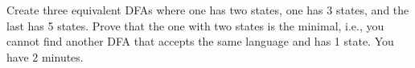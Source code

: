   Create three equivalent DFAs
  where
  one has two states, one has 3 states, and the last has 5 states.
  Prove that the one with two states is the minimal, i.e.,
  you cannot find another DFA that accepts the same language
  and has 1 state.
  You have 2 minutes.
